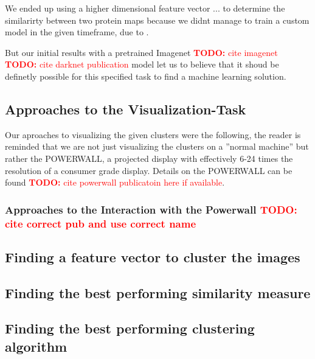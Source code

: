 \documentclass[journal]{vgtc}       %
\newcommand{\todo}[1]{\textcolor{red}{\textbf{TODO:} #1}}
\begin{document}
We ended up using a higher dimensional feature vector ... to determine the similarirty between two protein maps because we didnt manage to train a custom model in the given timeframe, due to .

But our initial results with a pretrained Imagenet \todo{cite imagenet} \todo{cite darknet publication} model let us to believe that it shoud be definetly possible for this specified task to find a machine learning solution. 

\subsection{Approaches to the Visualization-Task}

Our aproaches to visualizing the given clusters were the following, the reader is reminded that we are not just visualizing the clusters on a ''normal machine'' but rather the POWERWALL, a projected display with effectively 6-24 times the resolution of a consumer grade display. Details on the POWERWALL can be found \todo{cite powerwall publicatoin here if available}.


\subsubsection{Approaches to the Interaction with the Powerwall \todo{cite correct pub and use correct name}}


\subsection{Finding a feature vector to cluster the images}

\subsection{Finding the best performing similarity measure}
\subsection{Finding the best performing clustering algorithm}
\end{document}

